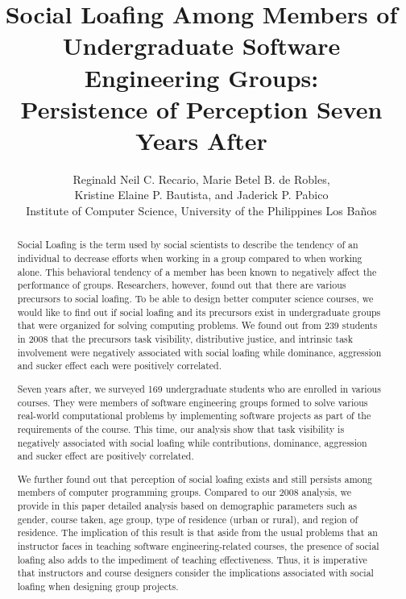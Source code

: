 \documentclass[a4paper,a4paper,BCOR12mm,12pt,abstracton,pointednumbers,tablecaptionabove,footinclude,halfparskip,normalheadings,]{scrartcl}
\newcommand{\UPLB}{University of the Philippines Los Ba\~{n}os}
\begin{document}
\title{\normalsize Social Loafing Among Members of\\Undergraduate Software Engineering Groups:\\Persistence of Perception Seven Years After}
\author{\normalsize Reginald Neil C. Recario, Marie Betel B. de Robles,\\ \normalsize Kristine Elaine P. Bautista, and Jaderick P. Pabico\\
 \normalsize Institute of Computer Science, \UPLB}
\date{}
\maketitle

\begin{abstract}
Social Loafing is the term used by social scientists to describe the tendency of an individual to decrease efforts when working in a group compared to when working alone. This behavioral tendency of a member has been known to negatively affect the performance of groups. Researchers, however, found out that there are various precursors to social loafing. To be able to design better computer science courses, we would like to find out if social loafing and its precursors exist in undergraduate groups that were organized for solving computing problems. We found out from 239 students in 2008 that the precursors task visibility, distributive justice, and intrinsic task involvement were negatively associated with social loafing while dominance, aggression and sucker effect each were positively correlated.



Seven years after, we surveyed 169 undergraduate students who are enrolled in various courses. They were members of software engineering groups formed to solve various real-world computational problems by implementing software projects as part of the requirements of the course. This time, our analysis show that task visibility is negatively associated with social loafing while contributions, dominance, aggression and sucker effect are positively correlated. 

We further found out that perception of social loafing exists and still persists among members of computer programming groups. Compared to our 2008 analysis, we provide in this paper detailed analysis based on demographic parameters such as gender, course taken, age group, type of residence (urban or rural), and region of residence. The implication of this result is that aside from the usual problems that an instructor faces in teaching software engineering-related courses, the presence of social loafing also adds to the impediment of teaching effectiveness. Thus, it is imperative that instructors and course designers consider the implications associated with social loafing when designing group projects.

\end{abstract}
\end{document}
